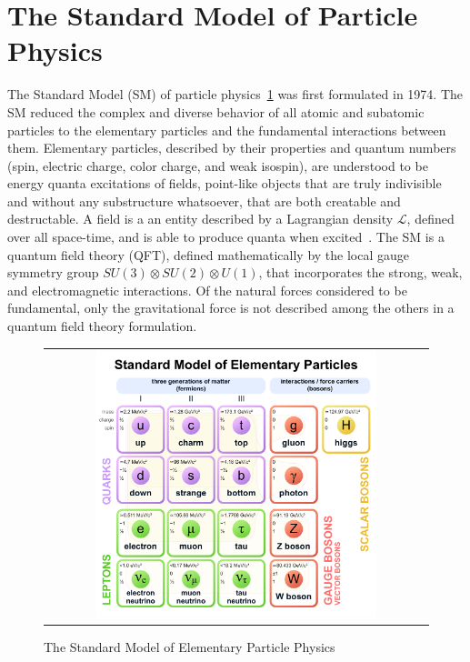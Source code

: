 \section{The Standard Model of Particle Physics}
The Standard Model (SM) of particle physics~\ref{Standard_Model} was first formulated in 1974.
The SM reduced the complex and diverse behavior of all atomic and subatomic particles to the elementary particles and the fundamental interactions between them. 
Elementary particles, described by their properties and quantum numbers (spin, electric charge, color charge, and  weak isospin), are understood to be energy quanta excitations of fields, point-like objects that are truly indivisible and without any substructure whatsoever, that are both creatable and destructable.
A field is a an entity described by a Lagrangian density $\mathcal{L}$, defined over all space-time, and is able to produce quanta when excited~\cite{nagashima_2013_V1}.
The SM is a quantum field theory (QFT), defined mathematically by the local gauge symmetry group $SU(3) \otimes SU(2) \otimes U(1)$, that incorporates the strong, weak, and electromagnetic interactions.
Of the natural forces considered to be fundamental, only the gravitational force is not described among the others in a quantum field theory formulation.
\begin{figure}[!ht]
  \begin{center}
    \begin{tabular}{c}
        \includegraphics[width=0.75\textwidth]{fig_Theory/Standard_Model.pdf}
    \end{tabular}
    \caption{The Standard Model of Elementary Particle Physics
            }
    \label{Standard_Model}
  \end{center}
\end{figure}

